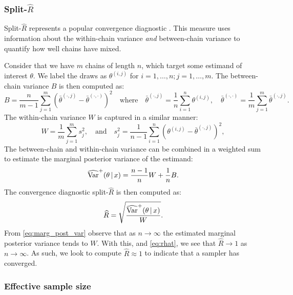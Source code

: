 \subsubsection{Split-$\widehat{R}$}

Split-$\widehat{R}$ represents a popular convergence diagnostic
\parencite{gelman13}. This measure uses information about the within-chain
variance \emph{and} between-chain variance to quantify how well chains have
mixed.

Consider that we have $m$ chains of length $n$, which target some estimand of
interest $\theta$. We label the draws as $\theta^{(i, j)}$ for $i=1,\ldots,n;
j=1,\ldots,m$. The between-chain variance $B$ is then computed as:
\begin{equation*}
  B = \frac{n}{m - 1} \sum_{j=1}^m (\bar{\theta}^{(\cdot, j)} - \bar{\theta}^{(\cdot,\cdot)})^2
    \quad \text{where} \quad
    \bar{\theta}^{(\cdot, j)} = \frac{1}{n} \sum_{i=1}^{n} \theta^{(i, j)},
    \quad
    \bar{\theta}^{(\cdot, \cdot)} = \frac{1}{m} \sum_{j=1}^m \bar{\theta}^{(\cdot, j)}.
\end{equation*}
The within-chain variance $W$ is captured in a similar manner:
\begin{equation*}
  W = \frac{1}{m} \sum_{j=1}^m s_j^2,
    \quad \text{and} \quad
    s_j^2 = \frac{1}{n-1} \sum_{i=1}^{n}(\theta^{(i, j)} - \bar{\theta}^{(\cdot,j)})^2,
\end{equation*}
The between-chain and within-chain variance can be combined in a weighted sum
to estimate the marginal posterior variance of the estimand:
\begin{equation}
  \label{eq:marg_post_var}
  \widehat{\text{Var}}^+ (\theta \,|\, x) = \frac{n-1}{n} W + \frac{1}{n} B.
\end{equation}
The convergence diagnostic split-$\widehat{R}$ is then computed as:
\begin{equation}
  \label{eq:rhat}
  \widehat{R} = \sqrt{\frac{\widehat{\text{Var}}^+ (\theta \,|\, x)}{W}}.
\end{equation}
From \cref{eq:marg_post_var} observe that as $n\rightarrow\infty$ the estimated
marginal posterior variance tends to $W$. With this, and \cref{eq:rhat}, we see
that $\widehat{R}\rightarrow1$ as $n\rightarrow\infty$. As such, we look to
compute $\widehat{R}\approx1$ to indicate that a sampler has converged.

\subsubsection{Effective sample size}

